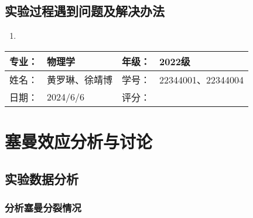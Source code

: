 \documentclass[dvipsnames, svgnames,a4paper,11pt]{article}
\begin{document}
	\subsection{实验过程遇到问题及解决办法}
	\begin{enumerate}
		\item 
	\end{enumerate}
	
	
	
	\clearpage
	
	\begin{table}
		\renewcommand\arraystretch{1.7}
		\begin{tabularx}{\textwidth}{|X|X|X|X|}
			\hline
			专业：& 物理学 &年级：& 2022级\\
			\hline
			姓名： & 黄罗琳、徐靖博 & 学号：&22344001、22344004 \\
			\hline
			日期：& 2024/6/6 & 评分： &\\
			\hline
		\end{tabularx}
	\end{table}
	
	\section{塞曼效应\quad\heiti 分析与讨论}
	
	\subsection{实验数据分析}
	\subsubsection{分析塞曼分裂情况}
\end{document}
